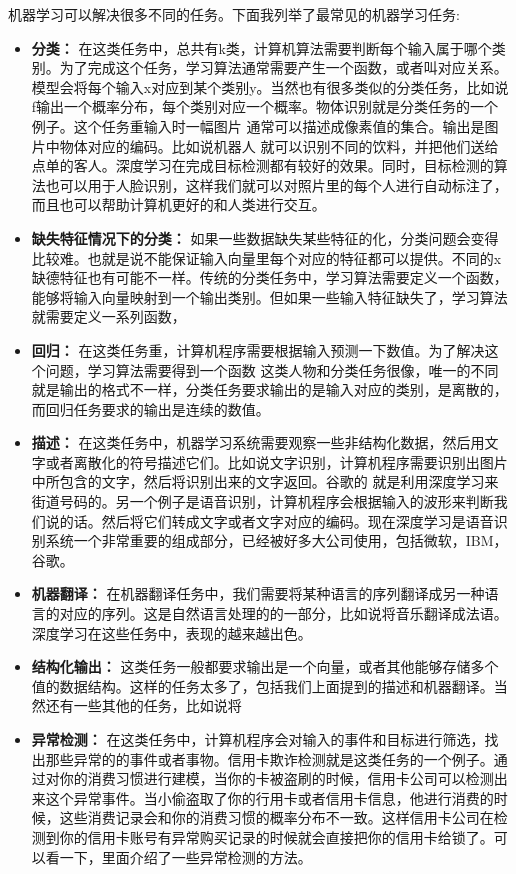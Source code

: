 机器学习可以解决很多不同的任务。下面我列举了最常见的机器学习任务:
\begin{itemize}
\item \textbf{分类：} 在这类任务中，总共有k类，计算机算法需要判断每个输入属于哪个类别。为了完成这个任务，学习算法通常需要产生一个函数，或者叫对应关系。模型会将每个输入x对应到某个类别y。当然也有很多类似的分类任务，比如说f输出一个概率分布，每个类别对应一个概率。物体识别就是分类任务的一个例子。这个任务重输入时一幅图片 通常可以描述成像素值的集合。输出是图片中物体对应的编码。比如说机器人 就可以识别不同的饮料，并把他们送给点单的客人。深度学习在完成目标检测都有较好的效果。同时，目标检测的算法也可以用于人脸识别，这样我们就可以对照片里的每个人进行自动标注了，而且也可以帮助计算机更好的和人类进行交互。

\item \textbf{缺失特征情况下的分类：} 如果一些数据缺失某些特征的化，分类问题会变得比较难。也就是说不能保证输入向量里每个对应的特征都可以提供。不同的x缺德特征也有可能不一样。传统的分类任务中，学习算法需要定义一个函数，能够将输入向量映射到一个输出类别。但如果一些输入特征缺失了，学习算法就需要定义一系列函数，

\item \textbf{回归：}  在这类任务重，计算机程序需要根据输入预测一下数值。为了解决这个问题，学习算法需要得到一个函数 这类人物和分类任务很像，唯一的不同就是输出的格式不一样，分类任务要求输出的是输入对应的类别，是离散的，而回归任务要求的输出是连续的数值。

\item \textbf{描述：}  在这类任务中，机器学习系统需要观察一些非结构化数据，然后用文字或者离散化的符号描述它们。比如说文字识别，计算机程序需要识别出图片中所包含的文字，然后将识别出来的文字返回。谷歌的 就是利用深度学习来街道号码的。另一个例子是语音识别，计算机程序会根据输入的波形来判断我们说的话。然后将它们转成文字或者文字对应的编码。现在深度学习是语音识别系统一个非常重要的组成部分，已经被好多大公司使用，包括微软，IBM，谷歌。

\item \textbf{机器翻译：}  在机器翻译任务中，我们需要将某种语言的序列翻译成另一种语言的对应的序列。这是自然语言处理的的一部分，比如说将音乐翻译成法语。深度学习在这些任务中，表现的越来越出色。
\item \textbf{结构化输出：} 这类任务一般都要求输出是一个向量，或者其他能够存储多个值的数据结构。这样的任务太多了，包括我们上面提到的描述和机器翻译。当然还有一些其他的任务，比如说将

\item \textbf{异常检测：}  在这类任务中，计算机程序会对输入的事件和目标进行筛选，找出那些异常的的事件或者事物。信用卡欺诈检测就是这类任务的一个例子。通过对你的消费习惯进行建模，当你的卡被盗刷的时候，信用卡公司可以检测出来这个异常事件。当小偷盗取了你的行用卡或者信用卡信息，他进行消费的时候，这些消费记录会和你的消费习惯的概率分布不一致。这样信用卡公司在检测到你的信用卡账号有异常购买记录的时候就会直接把你的信用卡给锁了。可以看一下，里面介绍了一些异常检测的方法。


\end{itemize}
